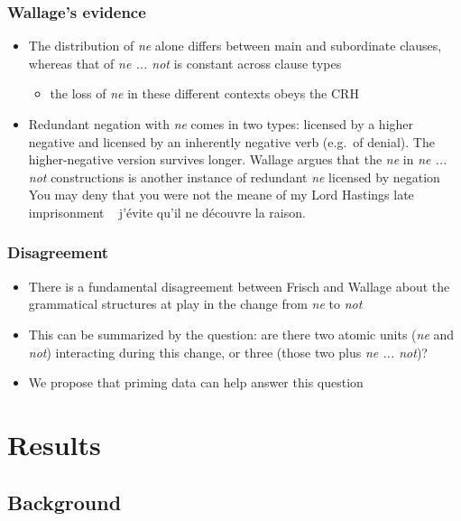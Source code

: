 \documentclass{digs-slides}
\begin{document}
\begin{frame}
    \frametitle{Wallage’s evidence}
    \begin{itemize}
      \item The distribution of \emph{ne} alone differs between main and
        subordinate clauses, whereas that of \emph{ne ... not} is
        constant across clause types
        \begin{itemize}
          \item the loss of \emph{ne} in these different contexts obeys
            the CRH
        \end{itemize}
      \item Redundant negation with \emph{ne} comes in two types:
        licensed by a higher negative and licensed by an inherently
        negative verb (e.g.\ of denial).  The higher-negative version
        survives longer.  Wallage argues that the \emph{ne} in \emph{ne
            ... not} constructions is another instance of redundant
        \emph{ne} licensed by negation
        \pause
        \ex
        You may deny that you were \alert{not} the meane of my Lord Hastings
        late imprisonment
        \xe
        \ex~
        j'évite qu'il ne découvre la raison.
        \xe
    \end{itemize}
\end{frame}

\begin{frame}
    \frametitle{Disagreement}
    \begin{itemize}
      \item There is a fundamental disagreement between Frisch and
        Wallage about the grammatical structures at play in the change from
        \emph{ne} to \emph{not}
      \item This can be summarized by the question: are there two atomic
        units (\emph{ne} and \emph{not}) interacting during this change,
        or three (those two plus \emph{ne ... not})?
      \item We propose that priming data can help answer this question
    \end{itemize}
\end{frame}

\section{Results}

\subsection{Background}
\end{document}
